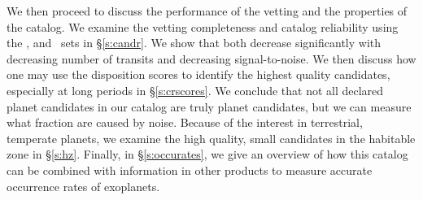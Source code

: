 We then proceed to discuss the performance of the vetting and the properties of the catalog. We examine the vetting completeness and catalog reliability using the \injtce, \invtce and \scrtce\ sets in \S\ref{s:candr}. We show that both decrease significantly with decreasing number of transits and decreasing signal-to-noise.  We then discuss how one may use the disposition scores to identify the highest quality candidates, especially at long periods in \S\ref{s:crscores}.  We conclude that not all declared planet candidates in our catalog are truly planet candidates, but we can measure what fraction are caused by noise. Because of the interest in terrestrial, temperate planets, we examine the high quality, small candidates in the habitable zone in \S\ref{s:hz}. Finally, in \S\ref{s:occurates}, we give an overview of how this catalog can be combined with information in other \Kepler{} products to measure accurate occurrence rates of exoplanets.








